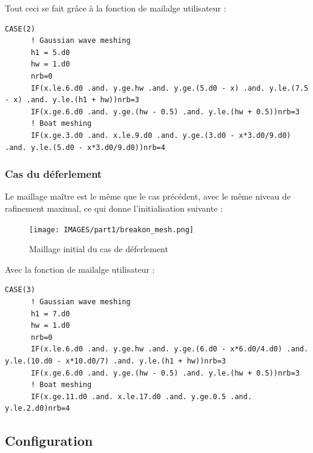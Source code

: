 \documentclass[../main.tex]{subfiles}
\begin{document}
Tout ceci se fait grâce à la fonction de mailalge utilisateur :
\begin{lstlisting}[style=f90, caption={Maillge utilisateur pour le cas de \textit{surf}}, captionpos=b]
    CASE(2)
      ! Gaussian wave meshing
      h1 = 5.d0
      hw = 1.d0
      nrb=0
      IF(x.le.6.d0 .and. y.ge.hw .and. y.ge.(5.d0 - x) .and. y.le.(7.5 - x) .and. y.le.(h1 + hw))nrb=3
      IF(x.ge.6.d0 .and. y.ge.(hw - 0.5) .and. y.le.(hw + 0.5))nrb=3
      ! Boat meshing
      IF(x.ge.3.d0 .and. x.le.9.d0 .and. y.ge.(3.d0 - x*3.d0/9.d0) .and. y.le.(5.d0 - x*3.d0/9.d0))nrb=4
\end{lstlisting}

\subsubsection{Cas du déferlement}
Le maillage maître est le même que le cas précédent, avec le même niveau de rafinement maximal, ce qui donne l'initialisation suivante :
\begin{figure}[H]
    \centering
    \texttt{[image: IMAGES/part1/breakon\_mesh.png]}
    \caption{Maillage initial du cas de déferlement}
\end{figure}

Avec la fonction de mailalge utilisateur :
\begin{lstlisting}[style=f90, caption={Maillage utilisateur pour le cas de déferlement}, captionpos=b]
    CASE(3)
      ! Gaussian wave meshing
      h1 = 7.d0
      hw = 1.d0
      nrb=0
      IF(x.le.6.d0 .and. y.ge.hw .and. y.ge.(6.d0 - x*6.d0/4.d0) .and. y.le.(10.d0 - x*10.d0/7) .and. y.le.(h1 + hw))nrb=3
      IF(x.ge.6.d0 .and. y.ge.(hw - 0.5) .and. y.le.(hw + 0.5))nrb=3
      ! Boat meshing
      IF(x.ge.11.d0 .and. x.le.17.d0 .and. y.ge.0.5 .and. y.le.2.d0)nrb=4
\end{lstlisting}



\subsection{Configuration}
\end{document}

